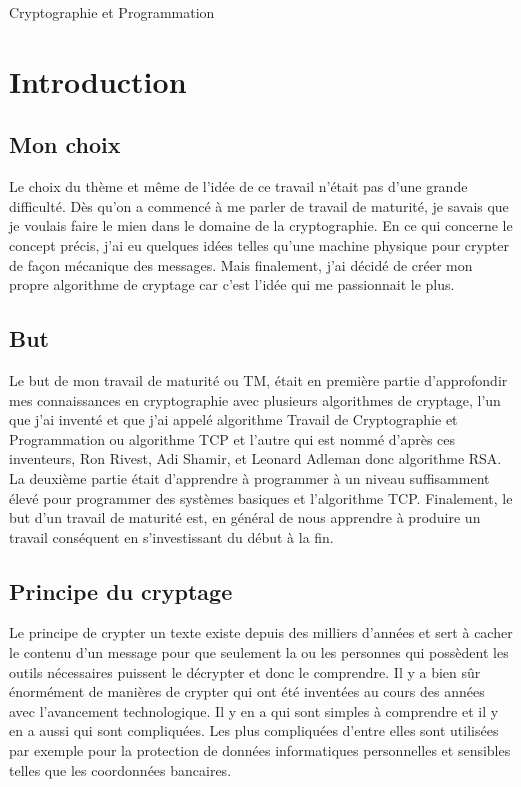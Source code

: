 \documentclass[a4paper,12pt]{report}
\begin{document}
	\doublespacing
     \tableofcontents
     \singlespacing
     \newpage
   
   \setcounter{page}{3}
   \begingroup
    \fontsize{24pt}{26pt}\selectfont     
Cryptographie et Programmation    
	\endgroup
	
	
     \section{Introduction}   

     \subsection{Mon choix}
     Le choix du thème et même de l'idée de ce travail n'était pas d'une grande difficulté. Dès qu'on a commencé à me parler de travail de maturité,  je savais que je voulais faire le mien dans le domaine de la cryptographie. En ce qui concerne le concept précis, j'ai eu quelques idées telles qu'une machine physique pour crypter de façon  mécanique des messages. Mais finalement, j'ai décidé de créer mon propre algorithme de cryptage car c'est l'idée qui me passionnait le plus.
     
     \subsection{But}
     Le but de mon travail de maturité ou TM, était en première partie d'appro\-fondir mes connaissances en cryptographie avec plusieurs algorithmes de crypt\-age, l'un que j'ai inventé et que j'ai appelé algorithme Travail de Cryptographie et Programmation ou algorithme TCP et l'autre qui est nommé d'après ces inventeurs, Ron Rivest, Adi Shamir, et Leonard Adleman donc algorithme RSA. La deuxième partie était d'apprendre à programmer à un niveau suffisamment élevé pour programmer des systèmes basiques et l'algorithme TCP. Finalement, le but d'un travail de maturité est, en général de nous apprendre à produire un travail conséquent en s'investissant du début à la fin.
     
     \subsection{Principe du cryptage}
     Le principe de crypter un texte existe depuis des milliers d'années et sert à cacher le contenu d'un message pour que seulement la ou les personnes qui possèdent les outils nécessaires puissent le décrypter et donc le comprendre. Il y a bien sûr énormément de manières de crypter qui ont été inventées au cours des années avec l'avancement technologique. Il y en a qui sont simples à comprendre et il y en a aussi qui sont compliquées. Les plus compliquées d'entre elles sont utilisées par exemple pour la protection de données informatiques personnelles et sensibles telles que les coordonnées bancaires.
     
\end{document}
